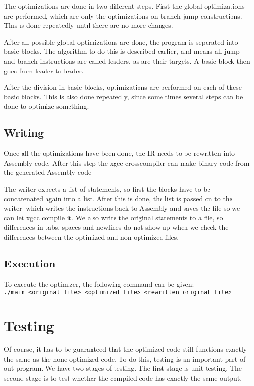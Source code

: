 \documentclass[10pt,a4paper]{article}
\begin{document}
The optimizations are done in two different steps. First the global
optimizations are performed, which are only the optimizations on branch-jump
constructions. This is done repeatedly until there are no more changes.

After all possible global optimizations are done, the program is seperated into
basic blocks. The algorithm to do this is described earlier, and means all
jump and branch instructions are called leaders, as are their targets. A basic
block then goes from leader to leader.

After the division in basic blocks, optimizations are performed on each of
these basic blocks. This is also done repeatedly, since some times several
steps can be done to optimize something.

\subsection{Writing}

Once all the optimizations have been done, the IR needs to be rewritten into
Assembly code. After this step the xgcc crosscompiler can make binary code from
the generated Assembly code.

The writer expects a list of statements, so first the blocks have to be
concatenated again into a list. After this is done, the list is passed on to
the writer, which writes the instructions back to Assembly and saves the file
so we can let xgcc compile it. We also write the original statements to a file,
so differences in tabs, spaces and newlines do not show up when we check the
differences between the optimized and non-optimized files.

\subsection{Execution}

To execute the optimizer, the following command can be given:\\
\texttt{./main <original file> <optimized file> <rewritten original file>}

\section{Testing}

Of course, it has to be guaranteed that the optimized code still functions
exactly the same as the none-optimized code. To do this, testing is an
important part of out program. We have two stages of testing. The first stage
is unit testing. The second stage is to test whether the compiled code has
exactly the same output.
\end{document}
